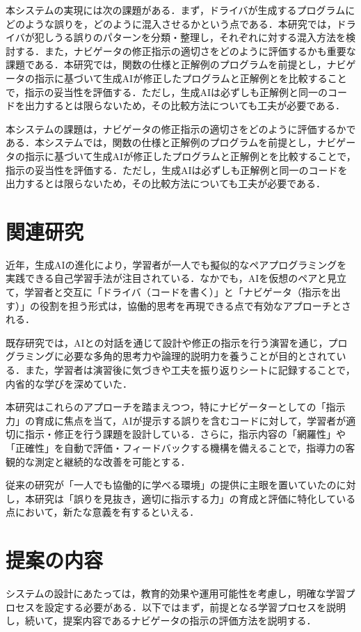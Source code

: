 \documentclass[twoside,twocolumn,10pt]{jsarticle}
\begin{document}
本システムの実現には次の課題がある．まず，ドライバが生成するプログラムにどのような誤りを，どのように混入させるかという点である．本研究では，ドライバが犯しうる誤りのパターンを分類・整理し，それぞれに対する混入方法を検討する．また，ナビゲータの修正指示の適切さをどのように評価するかも重要な課題である．本研究では，関数の仕様と正解例のプログラムを前提とし，ナビゲータの指示に基づいて生成AIが修正したプログラムと正解例とを比較することで，指示の妥当性を評価する．ただし，生成AIは必ずしも正解例と同一のコードを出力するとは限らないため，その比較方法についても工夫が必要である．

本システムの課題は，ナビゲータの修正指示の適切さをどのように評価するかである．本システムでは，関数の仕様と正解例のプログラムを前提とし，ナビゲータの指示に基づいて生成AIが修正したプログラムと正解例とを比較することで，指示の妥当性を評価する．ただし，生成AIは必ずしも正解例と同一のコードを出力するとは限らないため，その比較方法についても工夫が必要である．

\section{関連研究}\label{sec:関連研究}

近年，生成AIの進化により，学習者が一人でも擬似的なペアプログラミングを実践できる自己学習手法が注目されている．なかでも，AIを仮想のペアと見立て，学習者と交互に「ドライバ（コードを書く）」と「ナビゲータ（指示を出す）」の役割を担う形式は，協働的思考を再現できる点で有効なアプローチとされる．

既存研究では，AIとの対話を通じて設計や修正の指示を行う演習を通じ，プログラミングに必要な多角的思考力や論理的説明力を養うことが目的とされている．また，学習者は演習後に気づきや工夫を振り返りシートに記録することで，内省的な学びを深めていた\cite{原田紗希2024生成}．

本研究はこれらのアプローチを踏まえつつ，特にナビゲーターとしての「指示力」の育成に焦点を当て，AIが提示する誤りを含むコードに対して，学習者が適切に指示・修正を行う課題を設計している．さらに，指示内容の「網羅性」や「正確性」を自動で評価・フィードバックする機構を備えることで，指導力の客観的な測定と継続的な改善を可能とする．

従来の研究が「一人でも協働的に学べる環境」の提供に主眼を置いていたのに対し，本研究は「誤りを見抜き，適切に指示する力」の育成と評価に特化している点において，新たな意義を有するといえる．

\section{提案の内容}\label{sec:提案の内容}
システムの設計にあたっては，教育的効果や運用可能性を考慮し，明確な学習プロセスを設定する必要がある．以下ではまず，前提となる学習プロセスを説明し，続いて，提案内容であるナビゲータの指示の評価方法を説明する．
\end{document}
